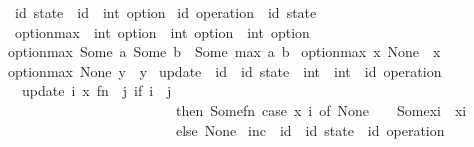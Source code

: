 \begin{isabellebody}%
\isamarkupfalse%
\ {\isacharparenleft}{\isacharprime}id{\isacharparenright}\ state\ {\isacharequal}\ {\isachardoublequoteopen}{\isacharprime}id\ {\isasymRightarrow}\ int\ option{\isachardoublequoteclose}\isanewline
{}\isamarkupfalse%
\ {\isacharparenleft}{\isacharprime}id{\isacharparenright}\ operation\ {\isacharequal}\ {\isachardoublequoteopen}{\isacharprime}id\ state{\isachardoublequoteclose}\isanewline
\isanewline
{}\isamarkupfalse%
\ option{\isacharunderscore}max\ {\isacharcolon}{\isacharcolon}\ {\isachardoublequoteopen}int\ option\ {\isasymRightarrow}\ int\ option\ {\isasymRightarrow}\ int\ option{\isachardoublequoteclose}\ \ \isanewline
{\isachardoublequoteopen}option{\isacharunderscore}max\ {\isacharparenleft}Some\ a{\isacharparenright}\ {\isacharparenleft}Some\ b{\isacharparenright}\ {\isacharequal}\ Some\ {\isacharparenleft}max\ a\ b{\isacharparenright}{\isachardoublequoteclose}\ {\isacharbar}\isanewline
{\isachardoublequoteopen}option{\isacharunderscore}max\ x\ None\ {\isacharequal}\ x{\isachardoublequoteclose}\ {\isacharbar}\isanewline
{\isachardoublequoteopen}option{\isacharunderscore}max\ None\ y\ {\isacharequal}\ y{\isachardoublequoteclose}\isanewline
\isanewline
{}\isamarkupfalse%
\ update\ {\isacharcolon}{\isacharcolon}\ {\isachardoublequoteopen}{\isacharprime}id\ {\isasymRightarrow}\ {\isacharprime}id\ state\ {\isasymRightarrow}\ {\isacharparenleft}int\ {\isasymRightarrow}\ int{\isacharparenright}\ {\isasymRightarrow}\ {\isacharparenleft}{\isacharprime}id\ operation{\isacharparenright}{\isachardoublequoteclose}\ \isanewline
\ \ {\isachardoublequoteopen}update\ i\ x\ fn\ {\isacharequal}\ {\isacharparenleft}{\isasymlambda}j{\isachardot}\ if\ i\ {\isacharequal}\ j\isanewline
\ \ \ \ \ \ \ \ \ \ \ \ \ \ \ \ \ \ \ \ \ \ \ \ then\ Some{\isacharparenleft}fn\ {\isacharparenleft}case\ {\isacharparenleft}x\ i{\isacharparenright}\ of\ None\ {\isasymRightarrow}\ {}\ {\isacharbar}\ Some{\isacharparenleft}xi{\isacharparenright}\ {\isasymRightarrow}\ xi{\isacharparenright}{\isacharparenright}\isanewline
\ \ \ \ \ \ \ \ \ \ \ \ \ \ \ \ \ \ \ \ \ \ \ \ else\ None{\isacharparenright}{\isachardoublequoteclose}\isanewline
\isanewline
{}\isamarkupfalse%
\ inc\ {\isacharcolon}{\isacharcolon}\ {\isachardoublequoteopen}{\isacharprime}id\ {\isasymRightarrow}\ {\isacharparenleft}{\isacharprime}id\ state{\isacharparenright}\ {\isasymRightarrow}\ {\isacharparenleft}{\isacharprime}id\ operation{\isacharparenright}{\isachardoublequoteclose}\ \isanewline

\end{isabellebody}
